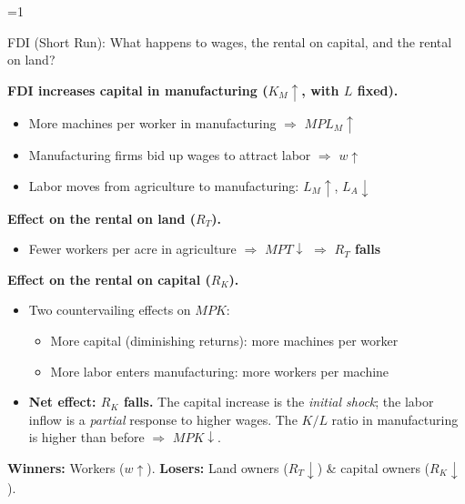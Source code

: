 \documentclass{beamer}
\newcommand{\showanswers}{1}  %
\begin{document}
\ifnum\showanswers=1
\begin{frame}{FDI (Short Run): What happens to wages, the rental on capital, and the rental on land?}

\textbf{FDI increases capital in manufacturing ($K_M \uparrow$, with $L$ fixed).}
\begin{itemize}
    \item More machines per worker in manufacturing $\Rightarrow$ $MPL_M \uparrow$
    \item Manufacturing firms bid up wages to attract labor $\Rightarrow$ $w \uparrow$
    \item Labor moves from agriculture to manufacturing: $L_M \uparrow$, $L_A \downarrow$
\end{itemize}

\vspace{0.2cm}

\textbf{Effect on the rental on land ($R_T$).}
\begin{itemize}
    \item Fewer workers per acre in agriculture $\Rightarrow$ $MPT \downarrow$ $\Rightarrow$ \textbf{$R_T$ falls}
\end{itemize}

\vspace{0.2cm}

\textbf{Effect on the rental on capital ($R_K$).}
\begin{itemize}
    \item Two countervailing effects on $MPK$:
    \begin{itemize}
        \item[$\downarrow$] More capital (diminishing returns): more machines per worker
        \item[$\uparrow$] More labor enters manufacturing: more workers per machine
    \end{itemize}
    \item \textbf{Net effect: $R_K$ falls.} The capital increase is the \textit{initial shock}; the labor inflow is a \textit{partial} response to higher wages. The $K/L$ ratio in manufacturing is higher than before $\Rightarrow$ $MPK \downarrow$.
\end{itemize}

\vspace{0.2cm}

\textbf{Winners:} Workers ($w \uparrow$). \hspace{0.02cm} \textbf{Losers:} Land owners ($R_T \downarrow$) \& capital owners ($R_K \downarrow$).

\end{frame}
\fi
\end{document}
